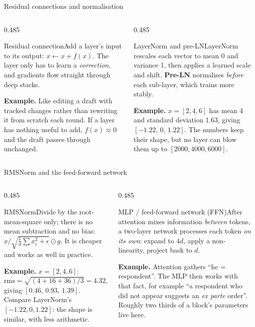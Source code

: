 \documentclass[aspectratio=169,11pt]{beamer}
\newcommand{\term}[3]{%
  \begin{block}{#1}\small #2\par\vspace{1mm}%
  {\color{exgreen}\textbf{Example.}} #3\end{block}}
\newcommand{\twoterms}[6]{%
  \begin{columns}[T]
    \begin{column}{0.485\textwidth}\term{#1}{#2}{#3}\end{column}
    \begin{column}{0.485\textwidth}\term{#4}{#5}{#6}\end{column}
  \end{columns}}
\begin{document}
\begin{frame}{Residual connections and normalisation}
  \twoterms{Residual connection}
  {Add a layer's input to its output: $x\leftarrow x+f(x)$. The layer only has to learn a \emph{correction}, and gradients flow straight through deep stacks.}
  {Like editing a draft with tracked changes rather than rewriting it from scratch each round. If a layer has nothing useful to add, $f(x)\approx0$ and the draft passes through unchanged.}
  {LayerNorm and pre-LN}
  {LayerNorm rescales each vector to mean 0 and variance 1, then applies a learned scale and shift. \textbf{Pre-LN} normalises \emph{before} each sub-layer, which trains more stably.}
  {$x=[2,4,6]$ has mean 4 and standard deviation 1.63, giving $[-1.22,\,0,\,1.22]$. The numbers keep their shape, but no layer can blow them up to $[2000,4000,6000]$.}
\end{frame}

\begin{frame}{RMSNorm and the feed-forward network}
  \twoterms{RMSNorm}
  {Divide by the root-mean-square only; there is no mean subtraction and no bias: $x/\sqrt{\frac1d\sum x_i^2+\epsilon}\odot g$. It is cheaper and works as well in practice.}
  {$x=[2,4,6]$: $\text{rms}=\sqrt{(4+16+36)/3}=4.32$, giving $[0.46,\,0.93,\,1.39]$. Compare LayerNorm's $[-1.22,0,1.22]$: the shape is similar, with less arithmetic.}
  {MLP / feed-forward network (FFN)}
  {After attention mixes information \emph{between} tokens, a two-layer network processes each token \emph{on its own}: expand to $4d$, apply a non-linearity, project back to $d$.}
  {Attention gathers ``he = respondent''. The MLP then works with that fact, for example ``a respondent who did not appear suggests an \emph{ex parte} order''. Roughly two thirds of a block's parameters live here.}
\end{frame}
\end{document}
